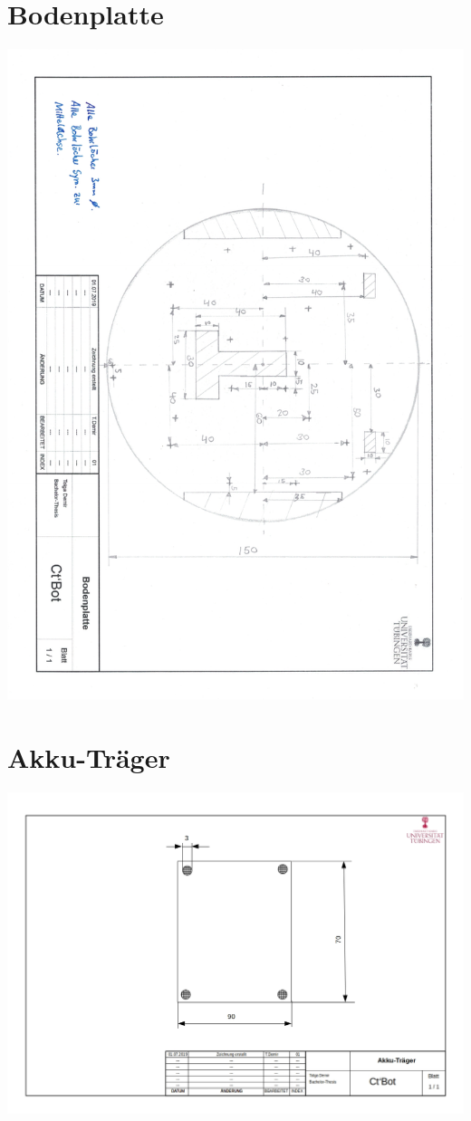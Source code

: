 \documentclass[twoside,11pt, a4paper]{report}
\begin{document}
	\section{Bodenplatte}
	\includegraphics[angle=180,origin=c, scale= 0.7]{images/Bodenplatte.pdf}
	\section{Akku-Träger}
	\includegraphics[angle=90,origin=c, scale= 0.7]{images/Zeichnung_Akku.jpg}
\end{document}
